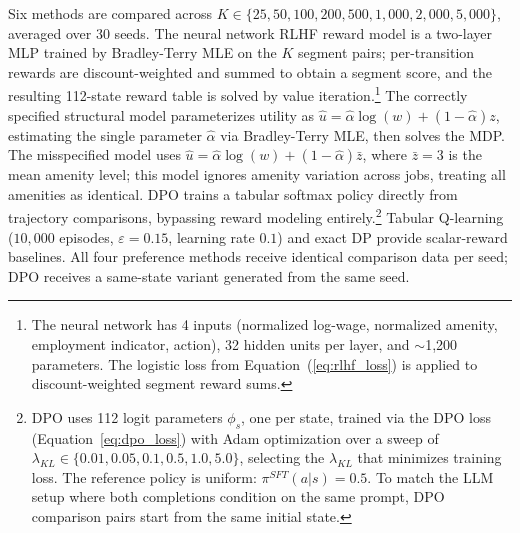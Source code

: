 Six methods are compared across $K \in \{25, 50, 100, 200, 500, 1{,}000, 2{,}000, 5{,}000\}$, averaged over 30 seeds. The neural network RLHF reward model is a two-layer MLP trained by Bradley-Terry MLE on the $K$ segment pairs; per-transition rewards are discount-weighted and summed to obtain a segment score, and the resulting 112-state reward table is solved by value iteration.\footnote{The neural network has 4 inputs (normalized log-wage, normalized amenity, employment indicator, action), 32 hidden units per layer, and $\sim$1{,}200 parameters. The logistic loss from Equation~(\ref{eq:rlhf_loss}) is applied to discount-weighted segment reward sums.} The correctly specified structural model parameterizes utility as $\hat{u} = \hat{\alpha} \log(w) + (1 - \hat{\alpha}) z$, estimating the single parameter $\hat{\alpha}$ via Bradley-Terry MLE, then solves the MDP. The misspecified model uses $\hat{u} = \hat{\alpha} \log(w) + (1 - \hat{\alpha}) \bar{z}$, where $\bar{z} = 3$ is the mean amenity level; this model ignores amenity variation across jobs, treating all amenities as identical. DPO trains a tabular softmax policy directly from trajectory comparisons, bypassing reward modeling entirely.\footnote{DPO uses 112 logit parameters $\phi_s$, one per state, trained via the DPO loss (Equation~\ref{eq:dpo_loss}) with Adam optimization over a sweep of $\lambda_{KL} \in \{0.01, 0.05, 0.1, 0.5, 1.0, 5.0\}$, selecting the $\lambda_{KL}$ that minimizes training loss. The reference policy is uniform: $\pi^{SFT}(a|s) = 0.5$. To match the LLM setup where both completions condition on the same prompt, DPO comparison pairs start from the same initial state.} Tabular Q-learning ($10{,}000$ episodes, $\varepsilon = 0.15$, learning rate $0.1$) and exact DP provide scalar-reward baselines. All four preference methods receive identical comparison data per seed; DPO receives a same-state variant generated from the same seed.


